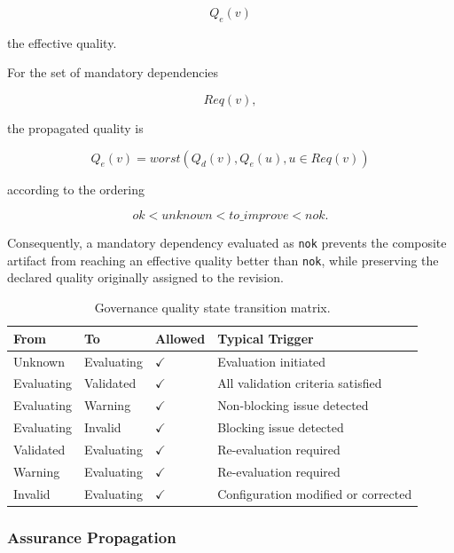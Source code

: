 \documentclass[10pt]{article}
\begin{document}
\[
Q_e(v)
\]

the effective quality.

For the set of mandatory dependencies

\[
Req(v),
\]

the propagated quality is

\begin{equation}
	Q_e(v)
	=
	worst
	\left(
	Q_d(v),
	Q_e(u),
	u\in Req(v)
	\right)
	\label{eq:quality_propagation}
\end{equation}

according to the ordering

\[
ok
<
unknown
<
to\_improve
<
nok.
\]

Consequently, a mandatory dependency evaluated as
\texttt{nok}
prevents the composite artifact from reaching an effective quality better than
\texttt{nok},
while preserving the declared quality originally assigned to the revision.

\begin{table}[ht]
	\caption{Governance quality state transition matrix.}
	\label{tab:quality_transition_matrix}
	\centering
	\small
	\begin{tabular}{llll}
		\toprule
		\textbf{From} & \textbf{To} & \textbf{Allowed} & \textbf{Typical Trigger} \\
		\midrule
		Unknown & Evaluating & $\checkmark$ & Evaluation initiated \\
		Evaluating & Validated & $\checkmark$ & All validation criteria satisfied \\
		Evaluating & Warning & $\checkmark$ & Non-blocking issue detected \\
		Evaluating & Invalid & $\checkmark$ & Blocking issue detected \\
		Validated & Evaluating & $\checkmark$ & Re-evaluation required \\
		Warning & Evaluating & $\checkmark$ & Re-evaluation required \\
		Invalid & Evaluating & $\checkmark$ & Configuration modified or corrected \\
		\bottomrule
	\end{tabular}
\end{table}

\subsubsection{Assurance Propagation}
\end{document}
